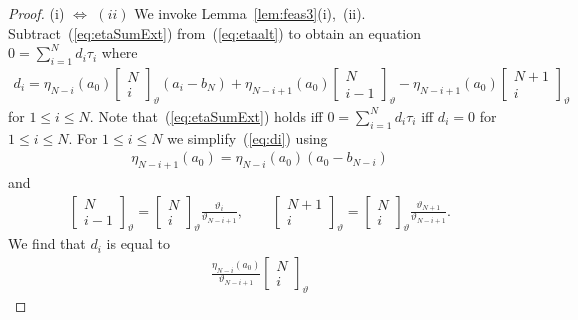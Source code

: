 \documentclass[pdftex]{sigma}
\numberwithin{equation}{section}
\begin{document}
\begin{proof}
(i) $\Leftrightarrow$ $(ii)$
We invoke Lemma~\ref{lem:feas3}(i),~(ii).
Subtract~(\ref{eq:etaSumExt})
from~(\ref{eq:etaalt}) to obtain an equation
$0 = \sum_{i=1}^N d_i \tau_i$ where
\begin{gather}\label{eq:di}
d_i=
 \eta_{N-i}(a_0)
\left[\begin{matrix} N \\
i \end{matrix} \right]_\vartheta
(a_i-b_N)
+
 \eta_{N-i+1}(a_0)
\left[\begin{matrix} N \\
i-1 \end{matrix} \right]_\vartheta
-
\eta_{N-i+1}(a_0)
\left[\begin{matrix} N+1 \\
i \end{matrix} \right]_\vartheta
\end{gather}
for $1 \leq i \leq N$.
Note that~(\ref{eq:etaSumExt}) holds iff
$0 = \sum_{i=1}^N d_i \tau_i$ iff
$d_i=0$ for $1\leq i \leq N$.
For $1 \leq i \leq N$
we simplify~(\ref{eq:di}) using
\begin{gather*}
\eta_{N-i+1}(a_0)= \eta_{N-i}(a_0)(a_0-b_{N-i})
\end{gather*}
and
\begin{gather*}
\left[\begin{matrix} N \\
i-1 \end{matrix} \right]_\vartheta
=
\left[\begin{matrix} N \\
i \end{matrix} \right]_\vartheta \frac{\vartheta_i}{\vartheta_{N-i+1}},
 \qquad
\left[\begin{matrix} N+1 \\
i \end{matrix} \right]_\vartheta
=
\left[\begin{matrix} N \\
i \end{matrix} \right]_\vartheta \frac{\vartheta_{N+1}}{\vartheta_{N-i+1}}.
\end{gather*}
We find that $d_i$ is equal to
\begin{gather*}
\frac{\eta_{N-i}(a_0)}{\vartheta_{N-i+1}}
\left[\begin{matrix} N \\
i \end{matrix} \right]_\vartheta
\end{gather*}

\end{proof}
\end{document}
